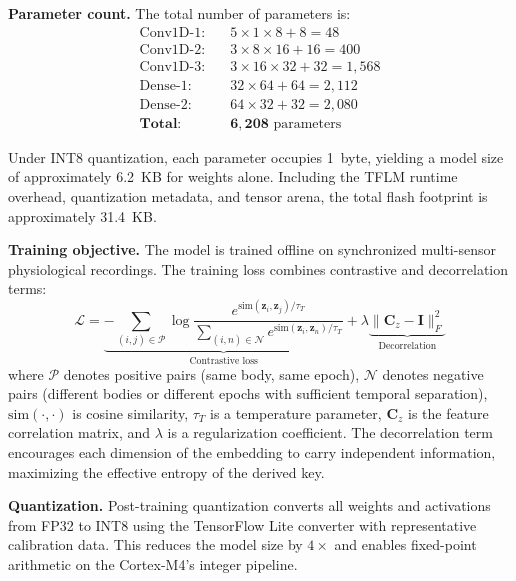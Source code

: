 \documentclass[10pt,twocolumn]{article}
\begin{document}
\textbf{Parameter count.} The total number of parameters is:
\begin{align}
\text{Conv1D-1}: & \quad 5 \times 1 \times 8 + 8 = 48 \nonumber \\
\text{Conv1D-2}: & \quad 3 \times 8 \times 16 + 16 = 400 \nonumber \\
\text{Conv1D-3}: & \quad 3 \times 16 \times 32 + 32 = 1{,}568 \nonumber \\
\text{Dense-1}: & \quad 32 \times 64 + 64 = 2{,}112 \nonumber \\
\text{Dense-2}: & \quad 64 \times 32 + 32 = 2{,}080 \nonumber \\
\textbf{Total}: & \quad \mathbf{6{,}208} \text{ parameters}
\label{eq:params}
\end{align}

Under INT8 quantization, each parameter occupies 1~byte, yielding a model size of approximately 6.2~KB for weights alone. Including the TFLM runtime overhead, quantization metadata, and tensor arena, the total flash footprint is approximately 31.4~KB.

\textbf{Training objective.} The model is trained offline on synchronized multi-sensor physiological recordings. The training loss combines contrastive and decorrelation terms:
\begin{equation}
\label{eq:loss}
\mathcal{L} = \underbrace{-\sum_{(i,j) \in \mathcal{P}} \log \frac{e^{\text{sim}(\mathbf{z}_i, \mathbf{z}_j)/\tau_T}}{\sum_{(i,n) \in \mathcal{N}} e^{\text{sim}(\mathbf{z}_i, \mathbf{z}_n)/\tau_T}}}_{\text{Contrastive loss}} + \lambda \underbrace{\|\mathbf{C}_z - \mathbf{I}\|_F^2}_{\text{Decorrelation}}
\end{equation}
where $\mathcal{P}$ denotes positive pairs (same body, same epoch), $\mathcal{N}$ denotes negative pairs (different bodies or different epochs with sufficient temporal separation), $\text{sim}(\cdot, \cdot)$ is cosine similarity, $\tau_T$ is a temperature parameter, $\mathbf{C}_z$ is the feature correlation matrix, and $\lambda$ is a regularization coefficient. The decorrelation term encourages each dimension of the embedding to carry independent information, maximizing the effective entropy of the derived key.

\textbf{Quantization.} Post-training quantization converts all weights and activations from FP32 to INT8 using the TensorFlow Lite converter with representative calibration data. This reduces the model size by $4\times$ and enables fixed-point arithmetic on the Cortex-M4's integer pipeline.
\end{document}
